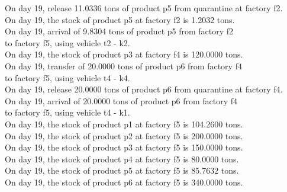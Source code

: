 \begin{table}[H]
\begin{multicols}{2}
\begin{tabbing}
On day 19, release 11.0336 tons of product p5 from quarantine at factory f2. \\
On day 19, the stock of product p5 at factory f2 is 1.2032 tons. \\
On day 19, arrival of 9.8304 tons of product p5 from factory f2 \\ to factory f5, using vehicle t2 - k2. \\
On day 19, the stock of product p3 at factory f4 is 120.0000 tons. \\
On day 19, transfer of 20.0000 tons of product p6 from factory f4 \\ to factory f5, using vehicle t4 - k4. \\
On day 19, release 20.0000 tons of product p6 from quarantine at factory f4. \\
On day 19, arrival of 20.0000 tons of product p6 from factory f4 \\ to factory f5, using vehicle t4 - k1. \\
On day 19, the stock of product p1 at factory f5 is 104.2600 tons. \\
On day 19, the stock of product p2 at factory f5 is 200.0000 tons. \\
On day 19, the stock of product p3 at factory f5 is 150.0000 tons. \\
On day 19, the stock of product p4 at factory f5 is 80.0000 tons. \\
On day 19, the stock of product p5 at factory f5 is 85.7632 tons. \\
On day 19, the stock of product p6 at factory f5 is 340.0000 tons. \\
\end{tabbing} 
\vspace{-2.0em}
    \end{multicols} \\
    \bottomrule
\end{table}
